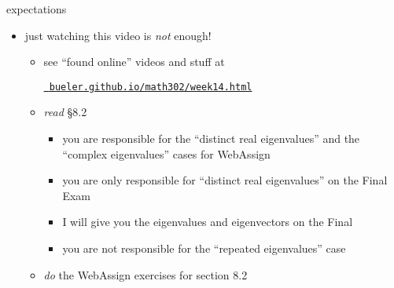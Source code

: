 \documentclass[urlcolor=blue,dvipsnames]{beamer}
\begin{document}
\begin{frame}{expectations}

\begin{itemize}
\item just watching this video is \emph{not} enough!
     \begin{itemize}
     \item see ``found online'' videos and stuff at

     \centerline{\href{https://bueler.github.io/math302/week14.html}{\tt \color{cyan} bueler.github.io/math302/week14.html}}
     \item \emph{read} \S8.2
         \begin{itemize}
         \item you \alert{are responsible} for the ``distinct real eigenvalues'' and the ``complex eigenvalues'' cases for WebAssign
         \item you \alert{are only responsible} for ``distinct real eigenvalues'' on the Final Exam
         \item I will give you the eigenvalues and eigenvectors on the Final
         \item you are not responsible for the ``repeated eigenvalues'' case
         \end{itemize}
     \item \emph{do} the WebAssign exercises for section 8.2
     \end{itemize}
\end{itemize}
\end{frame}
\end{document}
